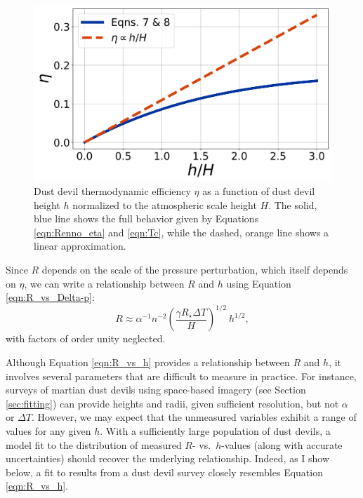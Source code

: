 \documentclass{aastex63}
\begin{document}
\begin{figure}
    \centering
    \includegraphics[width=\textwidth]{eta_vs_h-over-H.png}
    \caption{Dust devil thermodynamic efficiency $\eta$ as a function of dust devil height $h$ normalized to the atmospheric scale height $H$. The solid, blue line shows the full behavior given by Equations \ref{eqn:Renno_eta} and \ref{eqn:Tc}, while the dashed, orange line shows a linear approximation.}
    \label{fig:eta_vs_h-over-H}
\end{figure}

Since $R$ depends on the scale of the pressure perturbation, which itself depends on $\eta$, we can write a relationship between $R$ and $h$ using Equation \ref{eqn:R_vs_Delta-p}:
\begin{equation}
    R \approx \alpha^{-1} n^{-2} \left( \dfrac{\gamma R_\star \Delta T}{H} \right)^{1/2}\ h^{1/2},\label{eqn:R_vs_h}
\end{equation}
with factors of order unity neglected.


Although Equation \ref{eqn:R_vs_h} provides a relationship between $R$ and $h$, it involves several parameters that are difficult to measure in practice. For instance, surveys of martian dust devils using space-based imagery (see Section \ref{sec:fitting}) can provide heights and radii, given sufficient resolution, but not $\alpha$ or $\Delta T$. However, we may expect that the unmeasured variables exhibit a range of values for any given $h$. With a sufficiently large population of dust devils, a model fit to the distribution of measured $R$- vs.~$h$-values (along with accurate uncertainties) should recover the underlying relationship. Indeed, as I show below, a fit to results from a dust devil survey closely resembles Equation \ref{eqn:R_vs_h}.
\end{document}
